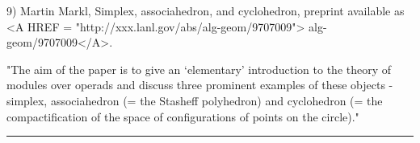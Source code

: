 9) Martin Markl, Simplex, associahedron, and cyclohedron, preprint
available as <A HREF = "http://xxx.lanl.gov/abs/alg-geom/9707009">
alg-geom/9707009</A>.

"The aim of the paper is to give an `elementary' introduction to the
theory of modules over operads and discuss three prominent examples of
these objects - simplex, associahedron (= the Stasheff polyhedron) and
cyclohedron (= the compactification of the space of configurations of
points on the circle)."



\par\noindent\rule{\textwidth}{0.4pt}


